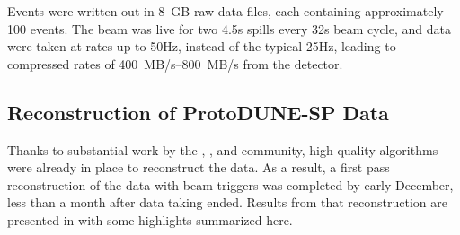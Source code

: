 Events were written out in \SI{8}{GB} raw data files, each containing approximately 100 events. The beam was live for two 4.5s spills every 32s beam cycle, and data were taken at  rates up to 50Hz, instead of the typical 25Hz, leading to compressed  rates of \SIrange{400}{800}{MB/s} from the detector.  

\subsection{Reconstruction of ProtoDUNE-SP Data}
Thanks to substantial work by the , , and   community, high quality algorithms were already in place to reconstruct the   data.  As a result, a first pass reconstruction of the  data with beam triggers was completed by early December, less than a month after data taking ended.  Results from that reconstruction are presented in \physchtools %
with some highlights summarized here. 



